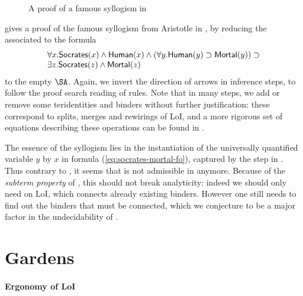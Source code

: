 \begin{scope}
\begin{figure*}
  
  \caption{A proof of a famous syllogism in }
\end{figure*}

 gives a proof of the famous syllogism from Aristotle
in , by reducing the  associated to the formula
\begin{equation}
  \begin{array}{l}
    \forall x. \mbox{\textsf{Socrates}}(x) \land \mbox{\textsf{Human}}(x) \land (\forall y. \mbox{\textsf{Human}}(y) \supset \mbox{\textsf{Mortal}}(y)) \supset \\
    \exists z. \mbox{\textsf{Socrates}}(z) \land \mbox{\textsf{Mortal}}(z) \label{eq:socrates-mortal-fo}
  \end{array}
\end{equation}
to the empty $\SA$. Again, we invert the direction of arrows in inference steps,
to follow the proof search reading of rules. Note that in many steps, we add or
remove some teridentities and binders without further justification: these
correspond to splits, merges and rewirings of LoI, and a more rigorous set of
equations describing these operations can be found in \cite[Section 3: ``The
algebra of lines of identity'']{pietarinen_compositional_2020}.

The essence of the syllogism lies in the instantiation of the universally
quantified variable $y$ by $x$ in formula (\ref{eq:socrates-mortal-fo}),
captured by the  step in . Thus
contrary to , it seems that  is not admissible in
 anymore. Because of the \emph{subterm property} of 
, this should not break analyticity:
indeed we should only need  on LoI, which connects already
existing binders. However one still needs to find out the binders that must be
connected, which we conjecture to be a major factor in the undecidability of
.

\section{Gardens}

\paragraph{Ergonomy of LoI}


\end{scope}
